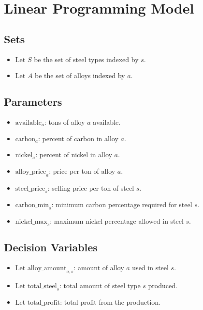 \documentclass{article}
\begin{document}
\section*{Linear Programming Model}

\subsection*{Sets}
\begin{itemize}
    \item Let \( S \) be the set of steel types indexed by \( s \).
    \item Let \( A \) be the set of alloys indexed by \( a \).
\end{itemize}

\subsection*{Parameters}
\begin{itemize}
    \item \( \text{available}_a \): tons of alloy \( a \) available.
    \item \( \text{carbon}_{a} \): percent of carbon in alloy \( a \).
    \item \( \text{nickel}_{a} \): percent of nickel in alloy \( a \).
    \item \( \text{alloy\_price}_{a} \): price per ton of alloy \( a \).
    \item \( \text{steel\_price}_{s} \): selling price per ton of steel \( s \).
    \item \( \text{carbon\_min}_{s} \): minimum carbon percentage required for steel \( s \).
    \item \( \text{nickel\_max}_{s} \): maximum nickel percentage allowed in steel \( s \).
\end{itemize}

\subsection*{Decision Variables}
\begin{itemize}
    \item Let \( \text{alloy\_amount}_{a,s} \): amount of alloy \( a \) used in steel \( s \).
    \item Let \( \text{total\_steel}_{s} \): total amount of steel type \( s \) produced.
    \item Let \( \text{total\_profit} \): total profit from the production.
\end{itemize}
\end{document}
